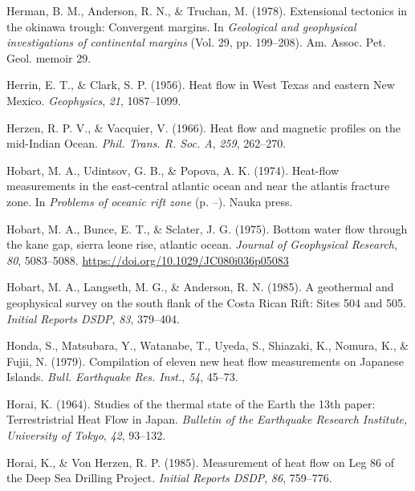 \begin{CSLReferences}{1}{1}
\leavevmode{}%
Herman, B. M., Anderson, R. N., \& Truchan, M. (1978). Extensional tectonics in the okinawa trough: Convergent margins. In \emph{Geological and geophysical investigations of continental margins} (Vol. 29, pp. 199--208). Am. Assoc. Pet. Geol. memoir 29.

\leavevmode{}%
Herrin, E. T., \& Clark, S. P. (1956). Heat flow in {West Texas and eastern New Mexico}. \emph{Geophysics}, \emph{21}, 1087--1099.

\leavevmode{}%
Herzen, R. P. V., \& Vacquier, V. (1966). Heat flow and magnetic profiles on the {mid-Indian Ocean}. \emph{Phil. Trans. R. Soc. A}, \emph{259}, 262--270.

\leavevmode{}%
Hobart, M. A., Udintsov, G. B., \& Popova, A. K. (1974). Heat-flow measurements in the east-central atlantic ocean and near the atlantis fracture zone. In \emph{Problems of oceanic rift zone} (p. --). Nauka press.

\leavevmode{}%
Hobart, M. A., Bunce, E. T., \& Sclater, J. G. (1975). Bottom water flow through the kane gap, sierra leone rise, atlantic ocean. \emph{Journal of Geophysical Research}, \emph{80}, 5083--5088. \url{https://doi.org/10.1029/JC080i036p05083}

\leavevmode{}%
Hobart, M. A., Langseth, M. G., \& Anderson, R. N. (1985). A geothermal and geophysical survey on the south flank of the {Costa Rican Rift}: Sites 504 and 505. \emph{Initial Reports DSDP}, \emph{83}, 379--404.

\leavevmode{}%
Honda, S., Matsubara, Y., Watanabe, T., Uyeda, S., Shiazaki, K., Nomura, K., \& Fujii, N. (1979). Compilation of eleven new heat flow measurements on {Japanese Islands}. \emph{Bull. Earthquake Res. Inst.}, \emph{54}, 45--73.

\leavevmode{}%
Horai, K. (1964). Studies of the thermal state of the {Earth} the 13th paper: {Terrestristrial Heat Flow in Japan}. \emph{Bulletin of the Earthquake Research Institute, University of Tokyo}, \emph{42}, 93--132.

\leavevmode{}%
Horai, K., \& Von Herzen, R. P. (1985). Measurement of heat flow on {Leg} 86 of the {Deep Sea Drilling Project}. \emph{Initial Reports DSDP}, \emph{86}, 759--776.


\end{CSLReferences}
